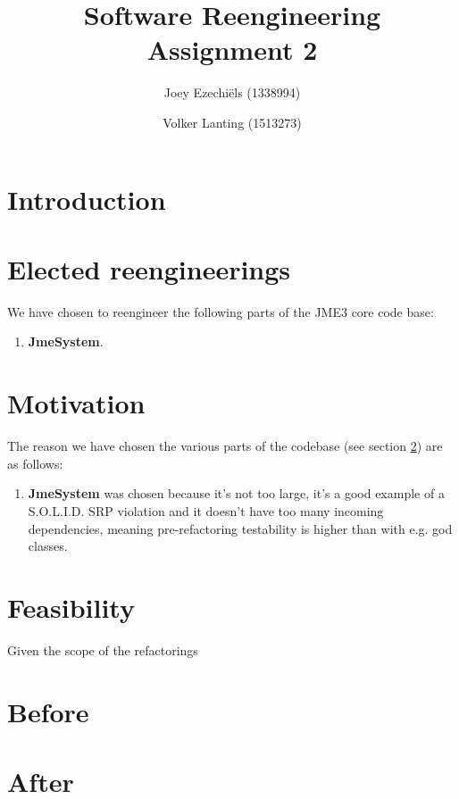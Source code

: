 \documentclass[a4paper, 10pt]{article}
\title{Software Reengineering\\
       Assignment 2}
\author{Joey Ezechi\"{e}ls (1338994) \and Volker Lanting (1513273)}
\begin{document}
\maketitle %

\newpage
\tableofcontents %


\newpage
{}
\section{Introduction}


\section{Elected reengineerings}
\label{sec:elected_reengineerings}
We have chosen to reengineer the following parts of the JME3 core code
base:
\begin{enumerate}
\item \textbf{JmeSystem}.
\end{enumerate}

\section{Motivation}
The reason we have chosen the various parts of the codebase (see
section \ref{sec:elected_reengineerings}) are as follows:
\begin{enumerate}
\item \textbf{JmeSystem} was chosen because it's not too large, it's
  a good example of a S.O.L.I.D. SRP violation and it doesn't have too
  many incoming dependencies, meaning pre-refactoring testability is
  higher than with e.g. god classes.
\end{enumerate}


\section{Feasibility}
Given the scope of the refactorings

\section{Before}


\section{After}
\end{document}
